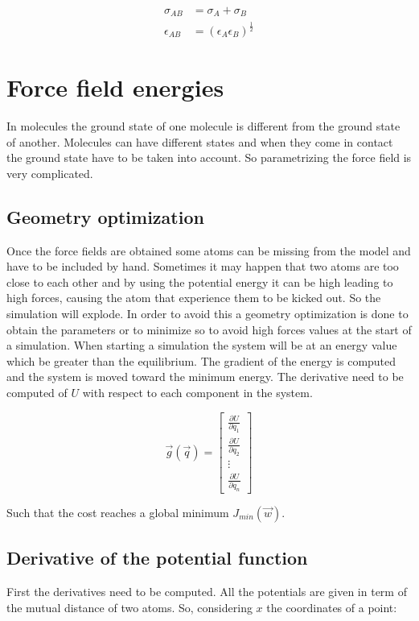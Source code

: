 \begin{align*}
	\sigma_{AB} &= \sigma_A+\sigma_B\\
	\epsilon_{AB} &= (\epsilon_A\epsilon_B)^{\frac{1}{2}}
\end{align*}

\section{Force field energies}
In molecules the ground state of one molecule is different from the ground state of another.
Molecules can have different states and when they come in contact the ground state have to be taken into account.
So parametrizing the force field is very complicated.

	\subsection{Geometry optimization}
	Once the force fields are obtained some atoms can be missing from the model and have to be included by hand.
	Sometimes it may happen that two atoms are too close to each other and by using the potential energy it can be high leading to high forces, causing the atom that experience them to be kicked out.
	So the simulation will explode.
	In order to avoid this a geometry optimization is done to obtain the parameters or to minimize so to avoid high forces values at the start of a simulation.
	When starting a simulation the system will be at an energy value which be greater than the equilibrium.
	The gradient of the energy is computed and the system is moved toward the minimum energy.
	The derivative need to be computed of $U$ with respect to each component in the system.

	$$\vec{g}(\vec{q}) = \begin{bmatrix} \frac{\partial U}{\partial q_1} \\ \frac{\partial U}{\partial q_2} \\ \vdots \\ \frac{\partial U}{\partial q_n}\end{bmatrix}$$

	Such that the cost reaches a global minimum $J_{min}(\vec{w})$.

	\subsection{Derivative of the potential function}
	First the derivatives need to be computed.
	All the potentials are given in term of the mutual distance of two atoms.
	So, considering $x$ the coordinates of a point:

